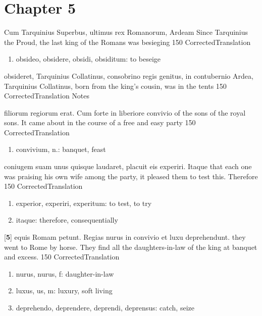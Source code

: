 \chapter*{Chapter 5} %
\label{sec:chapter_5}

\latline
  {Cum Tarquinius Superbus, ultimus rex Romanorum, Ardeam }
  { Since Tarquinius the Proud, the last king of the Romans was besieging }
  {150}
  { CorrectedTranslation }
  { \begin{enumerate}
  	\item obsideo, obsidere, obsidi, obsiditum:  to beseige
  \end{enumerate} }


\latline
  {obsideret, Tarquinius Collatinus, consobrino regis genitus, in contubernio}
  { Ardea, Tarquinius Collatinus, born from the king's cousin, was in the tents}
  {150}
  { CorrectedTranslation }
  { Notes }


\latline
  {filiorum regiorum erat.  Cum forte in liberiore convivio}
  { of the sons of the royal sons.  It came about in the course of a free and easy party }
  {150}
  { CorrectedTranslation }
  { \begin{enumerate}
  	\item convivium, n.:  banquet, feast
  \end{enumerate} }


\latline
  {coniugem suam unus quisque laudaret, placuit eis experiri.  Itaque}
  { that each one was praising his own wife among the party, it pleased them to test this.  Therefore}
  {150}
  { CorrectedTranslation }
  { \begin{enumerate}
  	\item experior, experiri, experitum:  to test, to try
  	\item itaque:  therefore, consequentially
  \end{enumerate} }


\latline
  {[\textbf{5}] equis Romam petunt.  Regias nurus in convivio et luxu deprehendunt.}
  { they went to Rome by horse.  They find all the daughters-in-law of the king at banquet and excess.   }
  {150}
  { CorrectedTranslation }
  { \begin{enumerate}
  	\item nurus, nurus, f:  daughter-in-law
  	\item luxus, us, m:  luxury, soft living
  	\item deprehendo, deprendere, deprendi, deprensus:  catch, seize
  \end{enumerate} }


